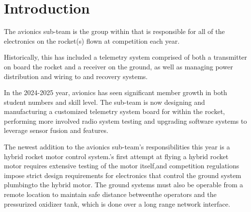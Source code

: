 \section{Introduction}

The avionics sub-team is the group within  that is responsible for all of the electronics on the rocket(s) flown at competition each year.

Historically, this has included a telemetry system comprised of both a transmitter on board the rocket and a receiver on the ground, as well as managing power distribution and wiring to  and  recovery systems.

In the 2024-2025 year, avionics has seen significant member growth in both student numbers and skill level. The sub-team is now designing and manufacturing a customized telemetry system  board for within the rocket, performing more involved radio system testing and upgrading software systems to leverage sensor fusion and  features.

The newest addition to the avionics sub-team's responsibilities this year is a hybrid rocket motor control system.'s first attempt at flying a hybrid rocket motor requires extensive testing of the motor itself,and competition regulations impose strict design requirements for electronics that control the ground system plumbingto the hybrid motor. The ground systems must also be operable from a remote location to maintain safe distance betweenthe operators and the pressurized oxidizer tank, which is done over a long range network interface.
